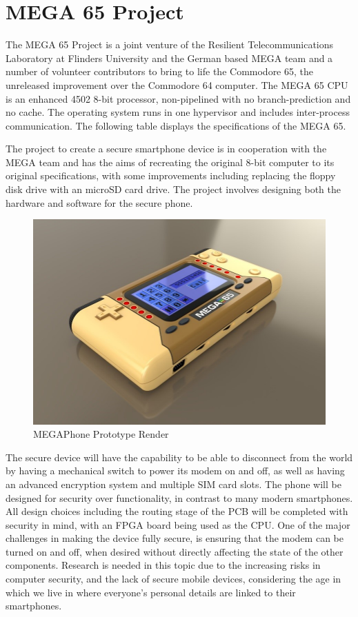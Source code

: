\section{MEGA 65 Project}

	The MEGA 65 Project is a joint venture of the Resilient Telecommunications Laboratory at Flinders University and the German based MEGA team and a number of volunteer contributors to bring to life the Commodore 65, the unreleased improvement over the Commodore 64 computer. The MEGA 65 CPU is an enhanced 4502 8-bit processor, non-pipelined with no branch-prediction and no cache. The operating system runs in one hypervisor and includes inter-process communication. The following table displays the specifications of the MEGA 65. 



	The project to create a secure smartphone device is in cooperation with the MEGA team and has the aims of recreating the original 8-bit computer to its original specifications, with some improvements including replacing the floppy disk drive with an microSD card drive. The project involves designing both the hardware and software for the secure phone. 

\begin{figure}
	\includegraphics[width=\linewidth]{render.jpg}
	\caption{MEGAPhone Prototype Render}
	\label{fig:render}
\end{figure}

	The secure device will have the capability to be able to disconnect from the world by having a mechanical switch to power its modem on and off, as well as having an advanced encryption system and multiple SIM card slots. The phone will be designed for security over functionality, in contrast to many modern smartphones. All design choices including the routing stage of the PCB will be completed with security in mind, with an FPGA board being used as the CPU.
	One of the major challenges in making the device fully secure, is ensuring that the modem can be turned on and off, when desired without directly affecting the state of the other components. 
	Research is needed in this topic due to the increasing risks in computer security, and the lack of secure mobile devices, considering the age in which we live in where everyone’s personal details are linked to their smartphones.

